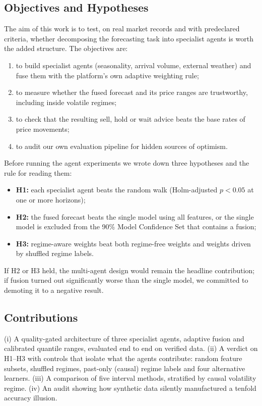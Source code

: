 \documentclass[runningheads]{llncs}
\begin{document}
\subsection{Objectives and Hypotheses}
The aim of this work is to test, on real market records and with predeclared criteria, whether decomposing the forecasting task into specialist agents is worth the added structure. The objectives are:
\begin{enumerate}
\item[\textbf{O1}] to build specialist agents (seasonality, arrival volume, external weather) and fuse them with the platform's own adaptive weighting rule;
\item[\textbf{O2}] to measure whether the fused forecast and its price ranges are trustworthy, including inside volatile regimes;
\item[\textbf{O3}] to check that the resulting sell, hold or wait advice beats the base rates of price movements;
\item[\textbf{O4}] to audit our own evaluation pipeline for hidden sources of optimism.
\end{enumerate}
Before running the agent experiments we wrote down three hypotheses and the rule for reading them:
\begin{itemize}
\item \textbf{H1:} each specialist agent beats the random walk (Holm-adjusted $p<0.05$ at one or more horizons);
\item \textbf{H2:} the fused forecast beats the single model using all features, or the single model is excluded from the 90\% Model Confidence Set that contains a fusion;
\item \textbf{H3:} regime-aware weights beat both regime-free weights and weights driven by shuffled regime labels.
\end{itemize}
If H2 or H3 held, the multi-agent design would remain the headline contribution; if fusion turned out significantly worse than the single model, we committed to demoting it to a negative result.

\subsection{Contributions}
(i) A quality-gated architecture of three specialist agents, adaptive fusion and calibrated quantile ranges, evaluated end to end on verified data. (ii) A verdict on H1--H3 with controls that isolate what the agents contribute: random feature subsets, shuffled regimes, past-only (causal) regime labels and four alternative learners. (iii) A comparison of five interval methods, stratified by causal volatility regime. (iv) An audit showing how synthetic data silently manufactured a tenfold accuracy illusion.
\end{document}
